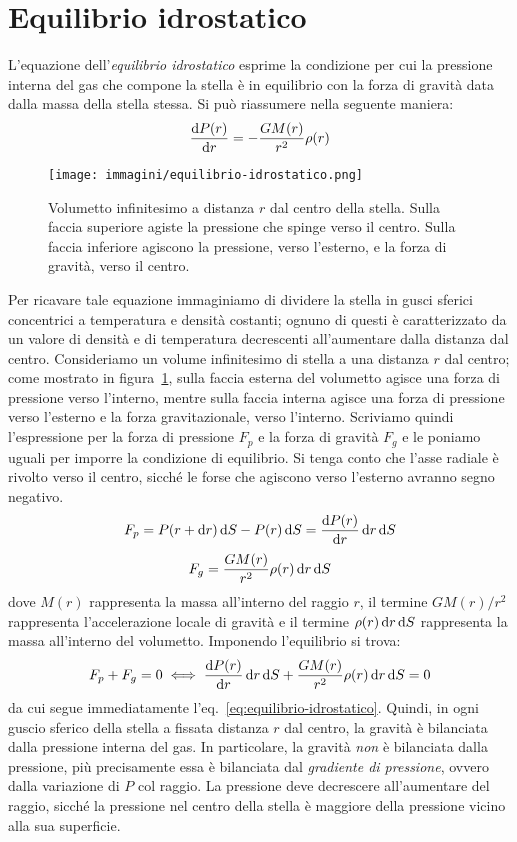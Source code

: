 \section{Equilibrio idrostatico}\label{sec:equilibrio-idrostatico}
L'equazione dell'\emph{equilibrio idrostatico} esprime la condizione per cui la pressione interna del gas che compone la stella è in equilibrio con la forza di gravità data dalla massa della stella stessa. Si può riassumere nella seguente maniera:
\begin{equation}\label{eq:equilibrio-idrostatico}
    \dfrac{\mathop{\mathrm{{}d}}\mathopen{} P(r)}{\mathop{\mathrm{{}d}}\mathopen{} r} = -\dfrac{G M(r)}{r^2} \rho(r)
\end{equation}

\begin{figure}
\centering
\texttt{[image: immagini/equilibrio-idrostatico.png]}
\caption{Volumetto infinitesimo a distanza $r$ dal centro della stella. Sulla faccia superiore agiste la pressione che spinge verso il centro. Sulla faccia inferiore agiscono la pressione, verso l'esterno, e la forza di gravità, verso il centro.}
\label{fig:equilibrio-idrostatico}
\end{figure}

Per ricavare tale equazione immaginiamo di dividere la stella in gusci sferici concentrici a temperatura e densità costanti; ognuno di questi è caratterizzato da un valore di densità e di temperatura decrescenti all'aumentare dalla distanza dal centro. Consideriamo un volume infinitesimo di stella a una distanza $r$ dal centro; come mostrato in figura~\ref{fig:equilibrio-idrostatico}, sulla faccia esterna del volumetto agisce una forza di pressione verso l'interno, mentre sulla faccia interna agisce una forza di pressione verso l'esterno e la forza gravitazionale, verso l'interno. Scriviamo quindi l'espressione per la forza di pressione $F_p$ e la forza di gravità $F_g$ e le poniamo uguali per imporre la condizione di equilibrio. Si tenga conto che l'asse radiale è rivolto verso il centro, sicché le forse che agiscono verso l'esterno avranno segno negativo.
\[
    F_p = P(r+\mathop{\mathrm{{}d}}\mathopen{} r) \mathop{\mathrm{{}d}}\mathopen{} S - P(r) \mathop{\mathrm{{}d}}\mathopen{} S = \frac{\mathop{\mathrm{{}d}}\mathopen{} P(r)}{\mathop{\mathrm{{}d}}\mathopen{} r} \mathop{\mathrm{{}d}}\mathopen{} r \mathop{\mathrm{{}d}}\mathopen{} S
\]
\[
    F_g = \frac{GM(r)}{r^2} \rho(r) \mathop{\mathrm{{}d}}\mathopen{} r \mathop{\mathrm{{}d}}\mathopen{} S
\]
dove $M(r)$ rappresenta la massa all'interno del raggio $r$, il termine $GM(r) / r^2$ rappresenta l'accelerazione locale di gravità e il termine $\rho(r) \mathop{\mathrm{{}d}}\mathopen{} r \mathop{\mathrm{{}d}}\mathopen{} S$ rappresenta la massa all'interno del volumetto. Imponendo l'equilibrio si trova:
\[
    F_p + F_g = 0 \iff \frac{\mathop{\mathrm{{}d}}\mathopen{} P(r)}{\mathop{\mathrm{{}d}}\mathopen{} r} \mathop{\mathrm{{}d}}\mathopen{} r \mathop{\mathrm{{}d}}\mathopen{} S+ \frac{GM(r)}{r^2} \rho(r) \mathop{\mathrm{{}d}}\mathopen{} r \mathop{\mathrm{{}d}}\mathopen{} S = 0
\]
da cui segue immediatamente l'eq.~\eqref{eq:equilibrio-idrostatico}. Quindi, in ogni guscio sferico della stella a fissata distanza $r$ dal centro, la gravità è bilanciata dalla pressione interna del gas. In particolare, la gravità \emph{non} è bilanciata dalla pressione, più precisamente essa è bilanciata dal \emph{gradiente di pressione}, ovvero dalla variazione di $P$ col raggio. La pressione deve decrescere all'aumentare del raggio, sicché la pressione nel centro della stella è maggiore della pressione vicino alla sua superficie. 

